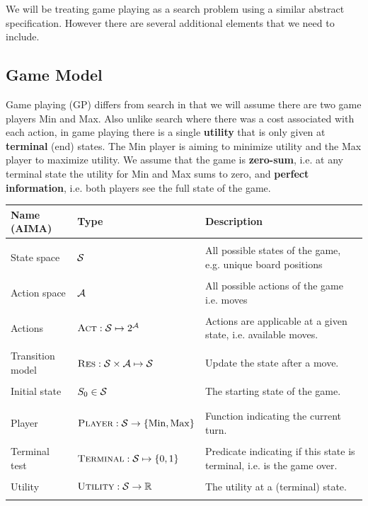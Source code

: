 \documentclass[11pt]{article}
\begin{document}
We will be treating game playing as a search problem using a similar abstract specification. However there are several additional elements that we need to include.

\subsection{Game Model}

Game playing (GP) differs from search in that we will assume there are two game players Min and Max. Also unlike search where there was a cost associated with each action, in game playing there is a single \textbf{utility} that is only given at \textbf{terminal} (end) states. The Min player is aiming to minimize utility and the Max player to maximize utility. We assume that the game is \textbf{zero-sum}, i.e. at any terminal state the utility for Min and Max sums to zero, and \textbf{perfect information}, i.e. both players see the full state of the game.

 \air
\begin{center}
\begin{tabularx}{\linewidth}{llX}
  \toprule
  Name (AIMA) & Type & Description \\
  \midrule
\\
 State space & $\mathcal{S}$ & All possible states of the game, e.g. unique board positions \\\\
 Action space & $\mathcal{A}$& All possible actions of the game i.e. moves\\\\
 Actions&  $\mathrm{\textsc{Act}}: \mathcal{S} \mapsto 2^{\mathcal{A}}$ & Actions are applicable at a given state, i.e. available moves. \\\\
 Transition model&  $\mathrm{\textsc{Res}}:  \mathcal{S} \times \mathcal{A} \mapsto \mathcal{S} $ &  Update the state after a move.  \\\\
 Initial state &  $S_0 \in \mathcal{S}$ & The starting state of the game.  \\\\
 \midrule \\
 Player& $\mathrm{\textsc{Player}}: \mathcal{S} \rightarrow \{\mathrm{Min}, \mathrm{Max}\}$ & Function indicating the current turn. \\\\
 Terminal test& $\mathrm{\textsc{Terminal}}: \mathcal{S} \mapsto \{0, 1\} $ & Predicate indicating if this state is terminal, i.e. is the game over. \\\\
 Utility & $\mathrm{\textsc{Utility}}: \mathcal{S} \rightarrow \mathbb{R}$ & The utility at a (terminal) state. \\\\
 \bottomrule
\end{tabularx}
\end{center}
\end{document}
